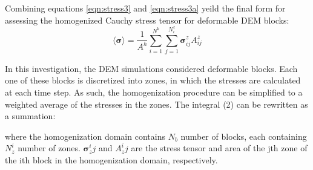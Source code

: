 Combining equations \ref{eqn:stress3} and \ref{eqn:stress3a} yeild the final form for assessing the homogenized Cauchy stress tensor for deformable DEM blocks:
\begin{equation}
\label{eqn:stress4}
\langle \boldsymbol{\sigma} \rangle = 
\frac{1}{A^h} \sum_{i=1}^{N^{b}} \sum_{j=1}^{N^{z}_i} \boldsymbol{\sigma}^z_{ij} A^{z}_{ij} 
\end{equation}


In this investigation, the DEM simulations considered deformable blocks. Each one of these blocks is discretized into zones, in which the stresses are calculated at each time step. As such, the homogenization procedure can be simplified to a weighted average of the stresses in the zones. The integral (2) can be rewritten as a summation: 


	
where the homogenization domain contains $N_b$ number of blocks, each containing $N_z^i$ number of zones. $\boldsymbol{\sigma}_z^ij$ and $A_z^ij$ are the stress tensor and area of the jth zone of the ith block in the homogenization domain, respectively.